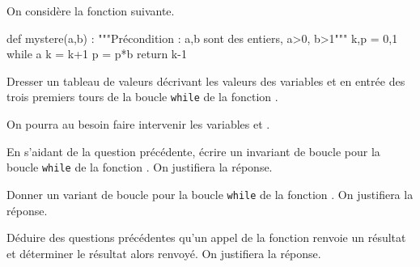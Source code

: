 On considère la fonction suivante. 
\begin{pyverbatim}
def mystere(a,b) :
    """Précondition : a,b sont des entiers, a>0, b>1"""
    k,p = 0,1
    while a %
        k = k+1
        p = p*b
    return k-1
\end{pyverbatim}    

\question{} Dresser un tableau de valeurs décrivant les valeurs des variables  et  en entrée des trois premiers tours de la boucle \texttt{while} de la fonction . 

On pourra au besoin faire intervenir les variables  et . 

\medskip{}

\question{} En s'aidant de la question précédente, écrire un invariant de boucle pour la boucle \texttt{while} de la fonction . On justifiera la réponse. 

\medskip{}

\question{} Donner un variant de boucle pour la boucle \texttt{while} de la fonction . On justifiera la réponse. 

\medskip{}

\question{} Déduire des questions précédentes qu'un appel de la fonction  renvoie un résultat et déterminer le résultat alors renvoyé. On justifiera la réponse. 
